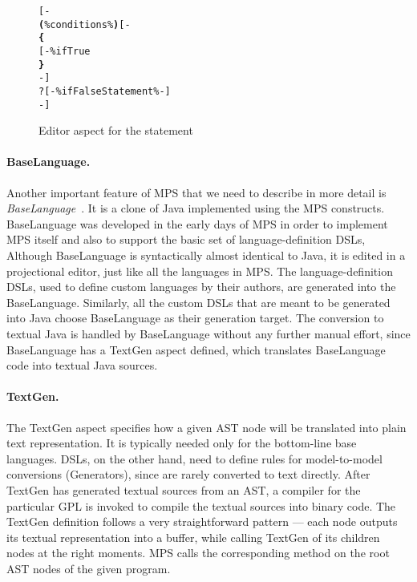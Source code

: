 \begin{figure}[ht]
\centering
\begin{alltt}
\small
{}  
    [-
       \textbf{(} \% conditions \% \textbf{)} [-
      \textbf{\{}
      [- \% ifTrue % -]
      \textbf{\}}
    -]
    ?[-  \% ifFalseStatement \% -]
    -]
\end{alltt}
\caption{Editor aspect for the  statement}
\label{fig:if_editor_definition}
\end{figure}

\paragraph{BaseLanguage.}
Another important feature of MPS that we need to describe in more detail is \emph{BaseLanguage}~\cite{ref:BASELANG}.
It is a clone of Java implemented using the MPS constructs.
BaseLanguage was developed in the early days of MPS in order to implement MPS itself and also to support the basic set of language-definition DSLs,
Although BaseLanguage is syntactically almost identical to Java, it is edited in a projectional editor, just like all the languages in MPS.
The language-definition DSLs, used to define custom languages by their authors, are generated into the BaseLanguage.
Similarly, all the custom DSLs that are meant to be generated into Java choose BaseLanguage as their generation target.
The conversion to textual Java is handled by BaseLanguage without any further manual effort, since BaseLanguage has a TextGen aspect defined, which translates BaseLanguage code into textual Java sources.

\paragraph{TextGen.}
The TextGen aspect specifies how a given AST node will be translated into plain text representation.
It is typically needed only for the bottom-line base languages.
DSLs, on the other hand, need to define rules for model-to-model conversions (Generators), since  are rarely converted to text directly.
After TextGen has generated textual sources from an AST, a compiler for the particular GPL is invoked to compile the textual sources into binary code.
The TextGen definition follows a very straightforward pattern --- each node outputs its textual representation into a buffer, while calling TextGen of its children nodes at the right moments.
MPS calls the corresponding method on the root AST nodes of the given program.


